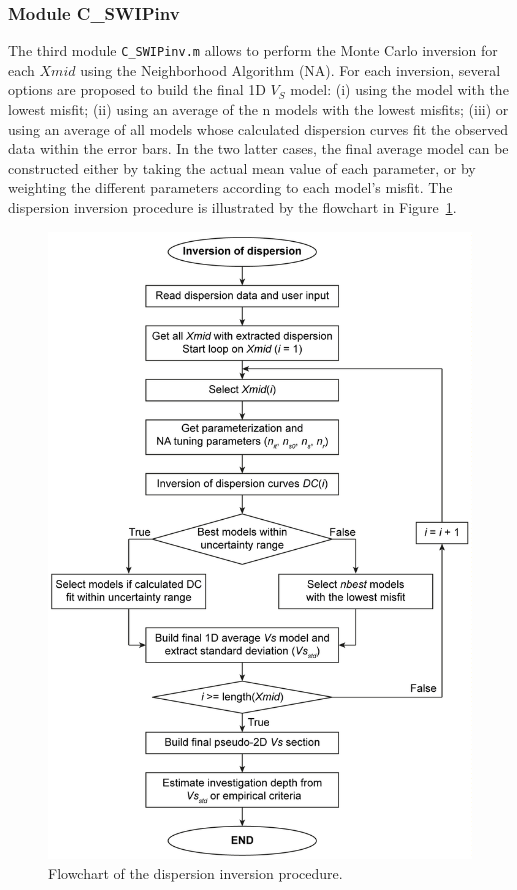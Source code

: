 \documentclass[twoside,a4paper]{article}
\begin{document}
\subsubsection{Module C\_SWIPinv}
\label{sec:moduleC}
The third module \verb|C_SWIPinv.m| allows to perform the Monte Carlo inversion for each $Xmid$ using the Neighborhood Algorithm (NA). For each inversion, several options are proposed to build the final 1D $V_S$ model: (i) using the model with the lowest misfit; (ii) using an average of the n models with the lowest misfits; (iii) or using an average of all models whose calculated dispersion curves fit the observed data within the error bars. In the two latter cases, the final average model can be constructed either by taking the actual mean value of each parameter, or by weighting the different parameters according to each model’s misfit. The dispersion inversion procedure is illustrated by the flowchart in Figure~\ref{fig:flowchart_inversion}.

\begin{figure}
\centerline{\includegraphics[width=0.65\linewidth]{figures/flowchart_inversion.png}}
\caption{Flowchart of the dispersion inversion procedure.}
\label{fig:flowchart_inversion}
\end{figure}
\end{document}

